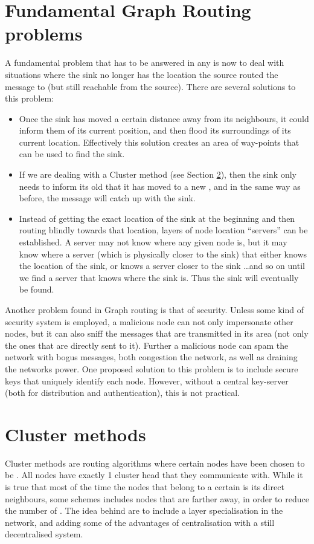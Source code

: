 \documentclass[letter, 12pt, english, draft]{article}
\begin{document}
\section{Fundamental Graph Routing problems}

A fundamental problem that has to be answered in any \manet is now to deal with situations where the sink no longer has the location the source routed the message to (but still reachable from the source). There are several solutions to this problem:

\begin{itemize}
\item Once the sink has moved a certain distance away from its neighbours, it could inform them of its current position, and then flood its surroundings of its current location. Effectively this solution creates an area of way-points that can be used to find the sink.
\item If we are dealing with a Cluster method (see Section \ref{cluster methods}), then the sink only needs to inform its old \ch that it has moved to a new \ch, and in the same way as before, the message will catch up with the sink.
\item Instead of getting the exact location of the sink at the beginning and then routing blindly towards that location, layers of node location ``servers'' can be established. A server may not know where any given node is, but it may know where a server (which is physically closer to the sink) that either knows the location of the sink, or knows a server closer to the sink \ldots and so on until we find a server that knows where the sink is. Thus the sink will eventually be found.
\end{itemize}

Another problem found in Graph routing is that of security. Unless some kind of security system is employed, a malicious node can not only impersonate other nodes, but it can also sniff the messages that are transmitted in its area (not only the ones that are directly sent to it). Further a malicious node can spam the network with bogus messages, both congestion the network, as well as draining the networks power. One proposed solution to this problem is to include secure keys that uniquely identify each node. However, without a central key-server (both for distribution and authentication), this is not practical.

\section{Cluster methods}
\label{cluster methods}
Cluster methods are routing algorithms where certain nodes have been chosen to be \ch. All nodes have exactly 1 cluster head that they communicate with. While it is true that most of the time the nodes that belong to a certain \ch is its direct neighbours, some schemes includes nodes that are farther away, in order to reduce the number of \ch. The idea behind \ch are to include a layer specialisation in the network, and adding some of the advantages of centralisation with a still decentralised system. 
\end{document}
